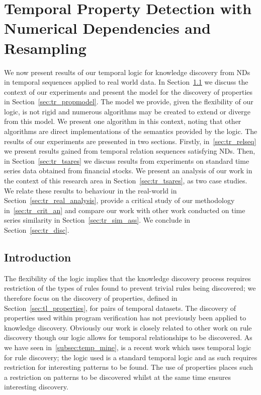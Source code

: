 \chapter{Temporal Property Detection with Numerical Dependencies and
Resampling}\label{chap:tempresult}

We now present results of our temporal logic for knowledge discovery
from NDs in temporal sequences applied to
real world data. In Section~\ref{sec:tr_intro} we discuss  the context
of our experiments and present the model for the discovery of
properties in Section~\ref{sec:tr_propmodel}. The model we provide,
given the flexibility of our logic, is not rigid and numerous
algorithms may be created to extend or diverge from this model. 
We present one algorithm in this context, noting that other algorithms
are direct implementations of the semantics provided by the logic. 
The results of our
experiments are presented in two sections. Firstly,
in~\ref{sec:tr_relseq} we present results gained from temporal
relation sequences satisfying NDs. Then, in
Section~\ref{sec:tr_tsares} we discuss results from experiments on
standard time series data obtained from financial stocks. We present
an analysis of our work in the context of this research area in
Section~\ref{sec:tr_tsares}, as two case studies. We relate these
results to behaviour in 
the real-world in Section~\ref{sec:tr_real_analysis}, provide a
critical study of our methodology in~\ref{sec:tr_crit_an} and compare
our work with other work conducted on time series similarity in
Section~\ref{sec:tr_sim_ass}. We conclude in Section~\ref{sec:tr_disc}.

\section{Introduction}\label{sec:tr_intro}

The flexibility of the
logic implies that the knowledge discovery process requires
restriction of the types of rules found to prevent trivial rules being
discovered; we therefore focus on the discovery of properties, defined
in Section~\ref{sec:tl_properties}, 
for pairs of temporal datasets. The discovery of properties used
within program verification has not previously been applied to
knowledge discovery. Obviously our 
work is closely related to other work on rule discovery though our
logic allows for temporal relationships to be discovered. As we have
seen in~\ref{subsec:temp_mine}, \cite{bt98} is
a recent work which uses temporal logic for rule discovery; the logic
used is a standard temporal logic and as such requires restriction for
interesting patterns to be found. The use of properties places such a
restriction on patterns to be discovered whilst at the same time
ensures interesting discovery.

